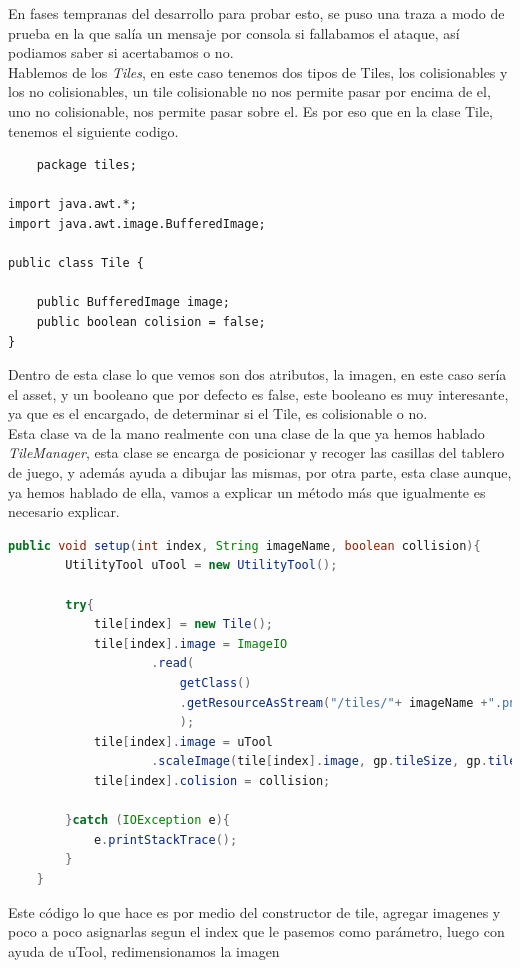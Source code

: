\documentclass[a4paper]{article}
\begin{document}
En fases tempranas del desarrollo para probar esto, se puso una traza a modo de prueba en la que salía un mensaje por consola si fallabamos el ataque, así podiamos saber si acertabamos o no.\\
\clearpage
Hablemos de los \textit{Tiles}, en este caso tenemos dos tipos de Tiles, los colisionables y los no colisionables, un tile colisionable no nos permite pasar por encima de el, uno no colisionable, nos permite pasar
sobre el. Es por eso que en la clase Tile, tenemos el siguiente codigo.
\begin{lstlisting}
    package tiles;

import java.awt.*;
import java.awt.image.BufferedImage;

public class Tile {

    public BufferedImage image;
    public boolean colision = false;
}
\end{lstlisting}
Dentro de esta clase lo que vemos son dos atributos, la imagen, en este caso sería el asset, y un booleano que por defecto es false, este booleano es muy interesante, ya que es el encargado, de determinar si el Tile, es colisionable o no.\\
Esta clase va de la mano realmente con una clase de la que ya hemos hablado \textit{TileManager}, esta clase se encarga de posicionar y recoger las casillas del tablero de juego, y además ayuda a dibujar las mismas, por otra parte, esta clase aunque,
ya hemos hablado de ella, vamos a explicar un método más que igualmente es necesario explicar.
\begin{lstlisting}[language=Java]
    public void setup(int index, String imageName, boolean collision){
        UtilityTool uTool = new UtilityTool();

        try{
            tile[index] = new Tile();
            tile[index].image = ImageIO
                    .read(
                        getClass()
                        .getResourceAsStream("/tiles/"+ imageName +".png")
                        );
            tile[index].image = uTool
                    .scaleImage(tile[index].image, gp.tileSize, gp.tileSize);
            tile[index].colision = collision;

        }catch (IOException e){
            e.printStackTrace();
        }
    }
\end{lstlisting}
Este código lo que hace es por medio del constructor de tile, agregar imagenes y poco a poco asignarlas segun el index que le pasemos como parámetro, luego con ayuda de uTool, redimensionamos la imagen
\end{document}
